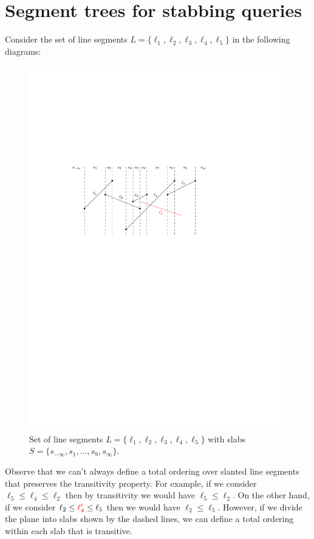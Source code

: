 \section{Segment trees for stabbing queries}
\label{sec:segmenet-trees}

Consider the set of line segments $L = \{ \ell_1, \ell_2, \ell_3, \ell_4, \ell_5\}$ in the following diagrams: 

\begin{figure}[h!]
\centering
\includegraphics[scale = .8]{ipe/slanted-lines.pdf}
\caption{Set of line segments $L = \{ \ell_1, \ell_2, \ell_3, \ell_4, \ell_5\}$ with slabs $S = \{s_{-\infty},s_1, \dots, s_9, s_{\infty} \}$.}
\end{figure}
Observe that we can't always define a total ordering over slanted line segments that preserves the transitivity property. 
%
For example, if we consider $\ell_5 \leq \ell_4 \leq \ell_2$ then by transitivity we would have $\ell_5 \leq \ell_2$. 
%
On the other hand, if we consider $\ell_2 \leq \textcolor{red}{\ell'_4} \leq \ell_5$ then we would have $\ell _2 \leq \ell_5$. 
%
However, if we divide the plane into slabs shown by the dashed lines, we can define a total ordering within each slab that is transitive. 

